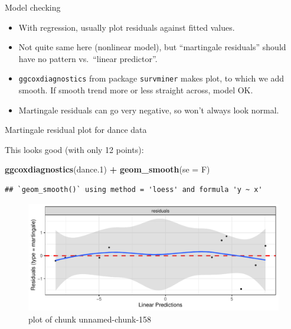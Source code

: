 \documentclass[ignorenonframetext,]{beamer}
\newenvironment{Shaded}{\begin{snugshade}}{\end{snugshade}}
\newcommand{\DataTypeTok}[1]{\textcolor[rgb]{0.13,0.29,0.53}{#1}}
\newcommand{\FloatTok}[1]{\textcolor[rgb]{0.00,0.00,0.81}{#1}}
\newcommand{\KeywordTok}[1]{\textcolor[rgb]{0.13,0.29,0.53}{\textbf{#1}}}
\newcommand{\NormalTok}[1]{#1}
\newcommand{\OperatorTok}[1]{\textcolor[rgb]{0.81,0.36,0.00}{\textbf{#1}}}
\newcommand{\StringTok}[1]{\textcolor[rgb]{0.31,0.60,0.02}{#1}}
\begin{document}
\begin{frame}[fragile]{Model checking}
\protect\hypertarget{model-checking}{}

\begin{itemize}
\item
  With regression, usually plot residuals against fitted values.
\item
  Not quite same here (nonlinear model), but ``martingale residuals''
  should have no pattern vs.~``linear predictor''.
\item
  \texttt{ggcoxdiagnostics} from package \texttt{survminer} makes plot,
  to which we add smooth. If smooth trend more or less straight across,
  model OK.
\item
  Martingale residuals can go very negative, so won't always look
  normal.
\end{itemize}

\end{frame}

\begin{frame}[fragile]{Martingale residual plot for dance data}
\protect\hypertarget{martingale-residual-plot-for-dance-data}{}

This looks good (with only 12 points):

\begin{Shaded}
\begin{Highlighting}[]
\KeywordTok{ggcoxdiagnostics}\NormalTok{(dance}\FloatTok{.1}\NormalTok{) }\OperatorTok{+}\StringTok{ }\KeywordTok{geom_smooth}\NormalTok{(}\DataTypeTok{se =}\NormalTok{ F)}
\end{Highlighting}
\end{Shaded}

\begin{verbatim}
## `geom_smooth()` using method = 'loess' and formula 'y ~ x'
\end{verbatim}

\begin{figure}
\centering
\includegraphics{figure/unnamed-chunk-158-1.pdf}
\caption{plot of chunk unnamed-chunk-158}
\end{figure}

\end{frame}
\end{document}
